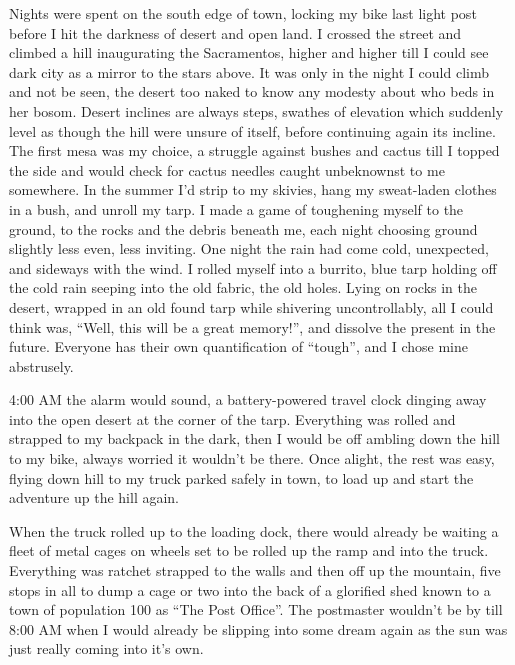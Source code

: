 \documentclass[ebook, 10pt, openright, onecolumn]{memoir}
\begin{document}
Nights were spent on the south edge of town, locking my bike last light post
before I hit the darkness of desert and open land.  I crossed the street and
climbed a hill inaugurating the Sacramentos, higher and higher till I could see
dark city as a mirror to the stars above.  It was only in the night I could
climb and not be seen, the desert too naked to know any modesty about who beds
in her bosom.  Desert inclines are always steps, swathes of elevation which
suddenly level as though the hill were unsure of itself, before continuing again
its incline.  The first mesa was my choice, a struggle against bushes and cactus
till I topped the side and would check for cactus needles caught unbeknownst to
me somewhere.  In the summer I'd strip to my skivies, hang my sweat-laden
clothes in a bush, and unroll my tarp.  I made a game of toughening myself to
the ground, to the rocks and the debris beneath me, each night choosing ground
slightly less even, less inviting.  One night the rain had come cold,
unexpected, and sideways with the wind.  I rolled myself into a burrito, blue
tarp holding off the cold rain seeping into the old fabric, the old holes.
Lying on rocks in the desert, wrapped in an old found tarp while shivering
uncontrollably, all I could think was, ``Well, this will be a great memory!'',
and dissolve the present in the future.  Everyone has their own quantification
of ``tough'', and I chose mine abstrusely.

4:00 AM the alarm would sound, a battery-powered travel clock dinging away into
the open desert at the corner of the tarp.  Everything was rolled and strapped
to my backpack in the dark, then I would be off ambling down the hill to my
bike, always worried it wouldn't be there.  Once alight, the rest was easy,
flying down hill to my truck parked safely in town, to load up and start the
adventure up the hill again.

When the truck rolled up to the loading dock, there would already be waiting a
fleet of metal cages on wheels set to be rolled up the ramp and into the truck.
Everything was ratchet strapped to the walls and then off up the mountain, five
stops in all to dump a cage or two into the back of a glorified shed known to a
town of population 100 as ``The Post Office''.  The postmaster wouldn't be by
till 8:00 AM when I would already be slipping into some dream again as the sun
was just really coming into it's own.
\end{document}
